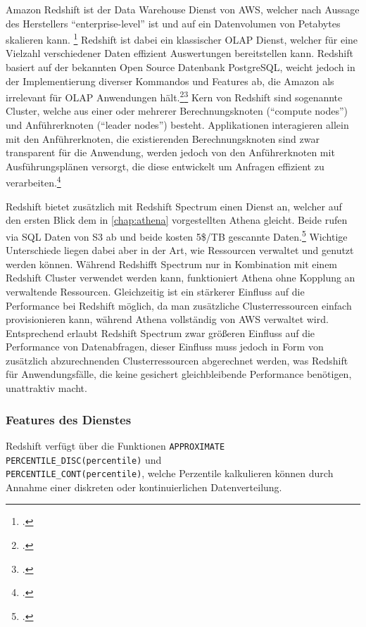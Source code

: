 Amazon Redshift ist der Data Warehouse Dienst von \ac{AWS}, welcher nach Aussage des Herstellers \enquote{enterprise-level} ist und auf ein Datenvolumen von Petabytes skalieren kann. \footcite[Vgl.][1]{AmazonWebServicesInc..o.J.g} Redshift ist dabei ein klassischer \ac{OLAP} Dienst, welcher für eine Vielzahl verschiedener Daten effizient Auswertungen bereitstellen kann. Redshift basiert auf der bekannten Open Source Datenbank PostgreSQL, weicht jedoch in der Implementierung diverser Kommandos und Features ab, die Amazon als irrelevant für \ac{OLAP} Anwendungen hält.\footcite[Vgl.][4]{AmazonWebServicesInc..o.J.g}\nzitat\footcite[Vgl.][428\psqq]{AmazonWebServicesInc..o.J.g} Kern von Redshift sind sogenannte Cluster, welche aus einer oder mehrerer Berechnungsknoten (\enquote{compute nodes}) und Anführerknoten (\enquote{leader nodes}) besteht. Applikationen interagieren allein mit den Anführerknoten, die existierenden Berechnungsknoten sind zwar transparent für die Anwendung, werden jedoch von den Anführerknoten mit Ausführungsplänen versorgt, die diese entwickelt um Anfragen effizient zu verarbeiten.\footcite[Vgl.][4]{AmazonWebServicesInc..o.J.g}

Redshift bietet zusätzlich mit Redshift Spectrum einen Dienst an, welcher auf den ersten Blick dem in \autoref{chap:athena} vorgestellten Athena gleicht. Beide rufen via \ac{SQL} Daten von \ac{S3} ab und beide kosten 5\$/TB gescannte Daten.\footcite[Vgl. auch im Folgenden][]{Smallcombe.2020} Wichtige Unterschiede liegen dabei aber in der Art, wie Ressourcen verwaltet und genutzt werden können. Während Redshifft Spectrum nur in Kombination mit einem Redshift Cluster verwendet werden kann, funktioniert Athena ohne Kopplung an verwaltende Ressourcen. Gleichzeitig ist ein stärkerer Einfluss auf die Performance bei Redshift möglich, da man zusätzliche Clusterressourcen einfach provisionieren kann, während Athena vollständig von \ac{AWS} verwaltet wird. Entsprechend erlaubt Redshift Spectrum zwar größeren Einfluss auf die Performance von Datenabfragen, dieser Einfluss muss jedoch in Form von zusätzlich abzurechnenden Clusterressourcen abgerechnet werden, was Redshift für Anwendungsfälle, die keine gesichert gleichbleibende Performance benötigen, unattraktiv macht.


\subsubsection{Features des Dienstes}
Redshift verfügt über die Funktionen \texttt{APPROXIMATE PERCENTILE_DISC(percentile)} und \\ \texttt{PERCENTILE_CONT(percentile)}, welche Perzentile kalkulieren können durch Annahme einer diskreten oder kontinuierlichen Datenverteilung.

